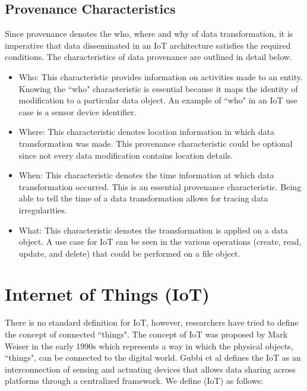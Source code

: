 \subsection{Provenance Characteristics}

Since provenance denotes the who, where and why of data transformation, it is imperative that data disseminated in an IoT architecture satisfies the required conditions. The characteristics of data provenance are outlined in detail below.


\begin{itemize}

\item Who: This characteristic provides information on activities made to an entity. Knowing the ``who" characteristic is essential because it maps the identity of modification to a particular data object. An example of ``who" in an IoT use case is a sensor device identifier.

\item Where: This characteristic denotes location information in which data transformation was made. This provenance characteristic could be optional since not every data modification contains location details.

\item When: This characteristic denotes the time information at which data transformation occurred. This is an essential provenance characteristic. Being able to tell the time of a data transformation allows for tracing data irregularities.

\item What: This characteristic denotes the transformation is applied on a data object. A use case for IoT can be seen in the various operations (create, read, update, and delete) that could be performed on a file object.

\end{itemize}


 
\section{Internet of Things (IoT)}
There is no standard definition for IoT, however, researchers have tried to define the concept of connected ``things". The concept of IoT was proposed by Mark Weiser in the early 1990s \cite{Mattern} which represents a way in which the physical objects, ``things", can be connected to the digital world. Gubbi et al \cite{park_provenance-based_2012} defines the IoT as  an interconnection of sensing and actuating devices that allows data sharing across platforms through a centralized framework. We define (IoT) as follows:

